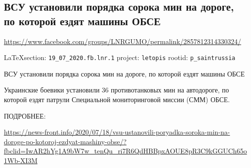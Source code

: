  
 
\subsection{ВСУ установили порядка сорока мин на дороге, по которой ездят машины ОБСЕ}
\label{sec:19_07_2020.fb.lnr.1}
\url{https://www.facebook.com/groups/LNRGUMO/permalink/2857812314330324/}

  
\vspace{0.5cm}
{\small\LaTeX section: \verb|19_07_2020.fb.lnr.1| project: \verb|letopis| rootid: \verb|p_saintrussia|}
\vspace{0.5cm}

ВСУ установили порядка сорока мин на дороге, по которой ездят машины ОБСЕ

Украинские боевики установили 36 противотанковых мин на автодороге, по которой
ездят патрули Специальной мониторинговой миссии (СММ) ОБСЕ.

ПОДРОБНЕЕ:
  
\url{https://news-front.info/2020/07/18/vsu-ustanovili-poryadka-soroka-min-na-doroge-po-kotoroj-ezdyat-mashiny-obse/?fbclid=IwAR2hYg1A9bW7w_tenQu_ri7R6QdHBBpxAOUE8pR3C9kGGUCh65o1Wb-XI3M}
